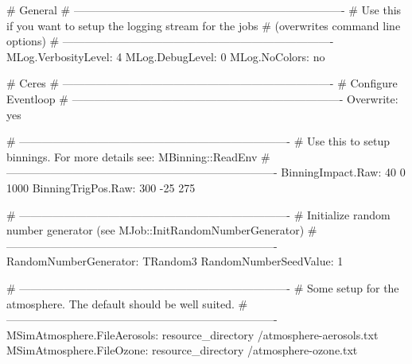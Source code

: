 #                              General
# -------------------------------------------------------------------------
# Use this if you want to setup the logging stream for the jobs
# (overwrites command line options)
# -------------------------------------------------------------------------
MLog.VerbosityLevel: 4
MLog.DebugLevel:     0
MLog.NoColors:       no

#                                   Ceres
# -------------------------------------------------------------------------
# Configure Eventloop
# -------------------------------------------------------------------------
Overwrite: yes


# -------------------------------------------------------------------------
# Use this to setup binnings. For more details see: MBinning::ReadEnv
# -------------------------------------------------------------------------
BinningImpact.Raw:  40 0 1000
BinningTrigPos.Raw: 300 -25 275


# -------------------------------------------------------------------------
# Initialize random number generator (see MJob::InitRandomNumberGenerator)
# -------------------------------------------------------------------------
RandomNumberGenerator: TRandom3
RandomNumberSeedValue: 1

# -------------------------------------------------------------------------
# Some setup for the atmosphere. The default should be well suited.
# -------------------------------------------------------------------------
MSimAtmosphere.FileAerosols: {{ resource_directory }}/atmosphere-aerosols.txt
MSimAtmosphere.FileOzone:    {{ resource_directory }}/atmosphere-ozone.txt


